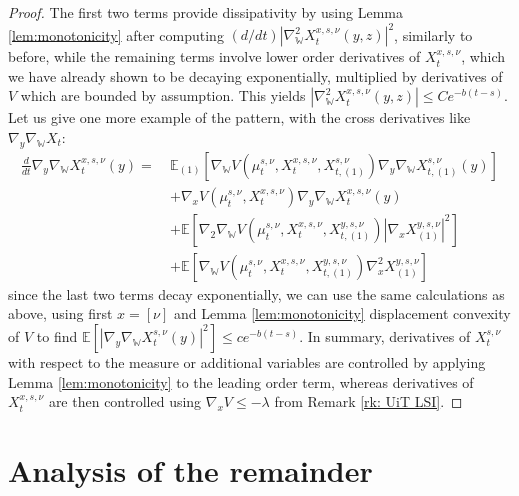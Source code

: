 \documentclass[11pt,reqno]{amsart}
\numberwithin{equation}{section}
\theoremstyle{definition}
\def\E{{\mathbb E}}
\newcommand{\wgrad}{\nabla_{\W}}
\newcommand{\W}{\mathbb W}
\begin{document}
\begin{proof}
The first two terms provide dissipativity by using Lemma \ref{lem:monotonicity} after computing $(d/dt)|\wgrad^2 X_t^{x,s,\nu}(y,z)|^2$, similarly to before, while the remaining terms involve lower order derivatives of $X_t^{x,s,\nu}$, which we have already shown to be decaying exponentially,
multiplied by derivatives of $V$ which are bounded by assumption.  This yields $|\wgrad^2 X_t^{x,s,\nu}(y,z)| \leq C e^{-b (t-s)}$. Let us give one more example of the pattern, with the cross derivatives like $\nabla_y \wgrad X_t$:
 \begin{align*}
     \frac{d}{dt}\nabla_y \wgrad X_t^{x,s,\nu}(y) = \ &\E_{(1)}[\wgrad V(\mu_t^{s,\nu},X_t^{x,s,\nu},X_{t,(1)}^{s,\nu})\nabla_y\wgrad X_{t,(1)}^{s,\nu}(y)] \\
     &+\nabla_x V(\mu_t^{s,\nu},X_t^{x,s,\nu})\nabla_y\wgrad X_t^{x,s,\nu}(y) \\
     &+ \E[\nabla_2\wgrad V(\mu_t^{s,\nu},X_t^{x,s,\nu},X_{t,(1)}^{y,s,\nu})|\nabla_x X_{(1)}^{y,s,\nu}|^2] \\
     &+ \E[\wgrad V(\mu_t^{s,\nu},X_t^{x,s,\nu},X_{t,(1)}^{y,s,\nu})\nabla^2_x X_{(1)}^{y,s,\nu}]
 \end{align*}
since the last two terms decay exponentially, we can use the same calculations as above, using first $x=[\nu]$ and Lemma \ref{lem:monotonicity} displacement convexity of $V$ to find $\E[|\nabla_y \wgrad X_t^{s,\nu}(y)|^2]\leq ce^{-b(t-s)}$. In summary, derivatives of $X_{t}^{s,\nu}$ with respect to the measure or additional variables are controlled by applying Lemma \ref{lem:monotonicity} to the leading order term, whereas derivatives of $X_{t}^{x,s,\nu}$ are then controlled using $\nabla_x V \le -\lambda$ from Remark \ref{rk: UiT LSI}. 
\end{proof}

\section{Analysis of the remainder}
\label{sect: remainder}
\end{document}
